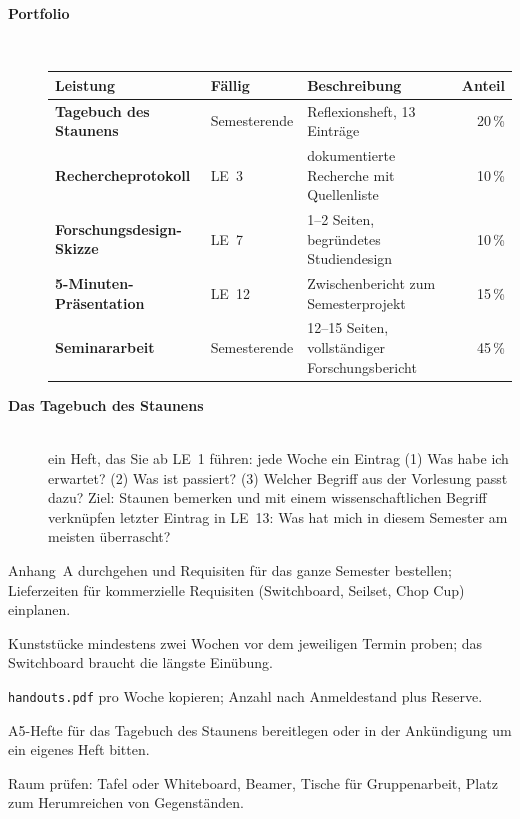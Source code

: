 \begin{description}
\item[{\rot\bf Portfolio}]~\\[-\lblskip]
\begin{center}
\small
{}
\begin{tabularx}{\linewidth}{@{}>{\bfseries}p{}p{}Xr@{}}
\toprule
\rowcolor{rwuviolet}\color{white}Leistung & \color{white}\textbf{Fällig} & \color{white}\textbf{Beschreibung} & \color{white}\textbf{Anteil} \\
\midrule
Tagebuch des Staunens & Semesterende & Reflexionsheft, 13 Einträge & 20\,\% \\
Rechercheprotokoll & LE~3 & dokumentierte Recherche mit Quellenliste & 10\,\% \\
Forschungsdesign-Skizze & LE~7 & 1--2 Seiten, begründetes Studiendesign & 10\,\% \\
5-Minuten-Präsentation & LE~12 & Zwischenbericht zum Semesterprojekt & 15\,\% \\
Seminararbeit & Semesterende & 12--15 Seiten, vollständiger Forschungsbericht & 45\,\% \\
\bottomrule
\end{tabularx}
\end{center}
\os{\newpage}

\item[{\rot\bf Das Tagebuch des Staunens}]~\\[-\lblskip]
\bi
  \ite ein Heft, das Sie ab LE~1 führen: jede Woche ein Eintrag
  \ite (1) Was habe ich erwartet? (2) Was ist passiert? (3) Welcher Begriff
    aus der Vorlesung passt dazu?
  \ite Ziel: Staunen bemerken und mit einem wissenschaftlichen Begriff
    verknüpfen
  \ite letzter Eintrag in LE~13: Was hat mich in diesem Semester am meisten
    überrascht?
\ei
\os{\newpage}
\end{description}

\begin{lehrhinweis}
\begin{checkliste}
  \item Anhang~A durchgehen und Requisiten für das ganze Semester bestellen;
    Lieferzeiten für kommerzielle Requisiten (Switchboard, Seilset, Chop Cup)
    einplanen.
  \item Kunststücke mindestens zwei Wochen vor dem jeweiligen Termin proben;
    das Switchboard braucht die längste Einübung.
  \item \texttt{handouts.pdf} pro Woche kopieren; Anzahl nach Anmeldestand
    plus Reserve.
  \item A5-Hefte für das Tagebuch des Staunens bereitlegen oder in der
    Ankündigung um ein eigenes Heft bitten.
  \item Raum prüfen: Tafel oder Whiteboard, Beamer, Tische für Gruppenarbeit,
    Platz zum Herumreichen von Gegenständen.
\end{checkliste}
\end{lehrhinweis}
